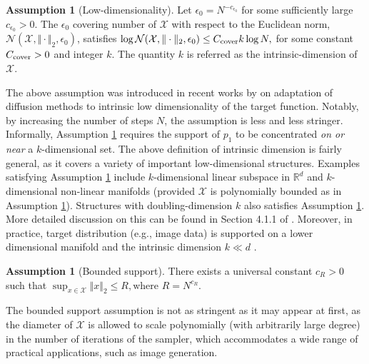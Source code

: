 \documentclass{article}
\theoremstyle{plain}
\theoremstyle{definition}
\newtheorem{assumption}[theorem]{Assumption}
\theoremstyle{remark}
\def\bbR{\mathbb{R}}
\def\cN{\mathcal{N}}
\def\cX{\mathcal{X}}
\def\Norm#1{\Vert#1\Vert}
\begin{document}
\begin{assumption}[Low-dimensionality]
\label{assumption: intrinsic dimension}
    Let $\epsilon_0 = N^{-c_{\epsilon_0}}$ for some sufficiently large $c_{\epsilon_0}>0$. The $\epsilon_0$ covering number of $\cX$ with respect to the Euclidean norm, $\cN(\cX, \Norm{\cdot}_2, \epsilon_0)$, satisfies
    $
    \log \cN(\cX, \Norm{\cdot}_2, \epsilon_0) \le C_{\rm cover} k \log N,
    $
    for some constant $C_{\rm cover}>0$ and integer $k$. The quantity $k$ is referred as the intrinsic-dimension of $\cX$.
\end{assumption}
The above assumption was introduced in recent works by \citet{huang2024denoising,li2024adapting,liang2025low} on adaptation of diffusion methods to intrinsic low dimensionality of the target function. Notably, by increasing the number of steps $N$, the assumption is less and less stringer.  Informally, Assumption \ref{assumption: intrinsic dimension} requires the support of $p_1$ to be concentrated \textit{on or near} a $k$-dimensional set.
The above definition of intrinsic dimension is fairly general, as it covers a variety of important low-dimensional structures. Examples satisfying Assumption \ref{assumption: intrinsic dimension} include $k$-dimensional linear subspace in $\bbR^d$ and $k$-dimensional non-linear manifolds (provided $\cX$ is polynomially bounded as in Assumption \ref{assumption: bounded support}). Structures with doubling-dimension $k$ \citep{dasgupta2008random, kpotufe2012tree} also satisfies Assumption \ref{assumption: intrinsic dimension}. More detailed discussion on this can be found in Section 4.1.1 of \citet{huang2024denoising}. Moreover, in practice, target distribution (e.g., image data) is supported on a lower dimensional manifold and the intrinsic dimension $k \ll d$ \citep{facco2017estimating, ansuini2019intrinsic, pope2021intrinsic}.
\begin{assumption}[Bounded support]
    \label{assumption: bounded support}
    There exists a universal constant $c_R>0$ such that 
    $
    \sup_{x \in \cX} \Norm{x}_2 \le R, \text{where $R = N^{c_R}$}.
    $
\end{assumption}
The bounded support assumption is not as stringent as it may appear at first, as the diameter of $\cX$ is allowed to scale polynomially (with arbitrarily large degree) in the
number of iterations of the sampler, which accommodates a wide range of practical applications, such as
image generation.
\end{document}
